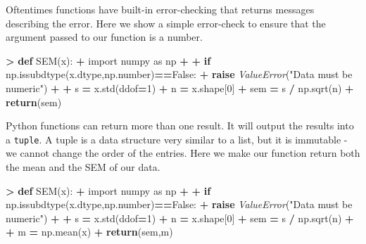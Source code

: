 \documentclass[
]{book}
\newenvironment{Shaded}{\begin{snugshade}}{\end{snugshade}}
\newcommand{\ControlFlowTok}[1]{\textcolor[rgb]{0.13,0.29,0.53}{\textbf{#1}}}
\newcommand{\DecValTok}[1]{\textcolor[rgb]{0.00,0.00,0.81}{#1}}
\newcommand{\ImportTok}[1]{#1}
\newcommand{\KeywordTok}[1]{\textcolor[rgb]{0.13,0.29,0.53}{\textbf{#1}}}
\newcommand{\NormalTok}[1]{#1}
\newcommand{\OperatorTok}[1]{\textcolor[rgb]{0.81,0.36,0.00}{\textbf{#1}}}
\newcommand{\PreprocessorTok}[1]{\textcolor[rgb]{0.56,0.35,0.01}{\textit{#1}}}
\newcommand{\StringTok}[1]{\textcolor[rgb]{0.31,0.60,0.02}{#1}}
\newcommand{\VariableTok}[1]{\textcolor[rgb]{0.00,0.00,0.00}{#1}}
\begin{document}
Oftentimes functions have built-in error-checking that returns messages describing the error. Here we show a simple error-check to ensure that the argument passed to our function is a number.

\begin{Shaded}
\begin{Highlighting}[]
\OperatorTok{\textgreater{}} \KeywordTok{def}\NormalTok{ SEM(x):}
\OperatorTok{+}   \ImportTok{import}\NormalTok{ numpy }\ImportTok{as}\NormalTok{ np}
\OperatorTok{+}   
\OperatorTok{+}   \ControlFlowTok{if}\NormalTok{ np.issubdtype(x.dtype,np.number)}\OperatorTok{==}\VariableTok{False}\NormalTok{:}
\OperatorTok{+}     \ControlFlowTok{raise} \PreprocessorTok{ValueError}\NormalTok{(}\StringTok{"Data must be numeric"}\NormalTok{)}
\OperatorTok{+}   
\OperatorTok{+}\NormalTok{   s }\OperatorTok{=}\NormalTok{ x.std(ddof}\OperatorTok{=}\DecValTok{1}\NormalTok{) }
\OperatorTok{+}\NormalTok{   n }\OperatorTok{=}\NormalTok{ x.shape[}\DecValTok{0}\NormalTok{] }
\OperatorTok{+}\NormalTok{   sem }\OperatorTok{=}\NormalTok{ s }\OperatorTok{/}\NormalTok{ np.sqrt(n) }
\OperatorTok{+}   \ControlFlowTok{return}\NormalTok{(sem) }
\end{Highlighting}
\end{Shaded}

Python functions can return more than one result. It will output the results into a \texttt{tuple}. A tuple is a data structure very similar to a list, but it is immutable - we cannot change the order of the entries. Here we make our function return both the mean and the SEM of our data.

\begin{Shaded}
\begin{Highlighting}[]
\OperatorTok{\textgreater{}} \KeywordTok{def}\NormalTok{ SEM(x):}
\OperatorTok{+}   \ImportTok{import}\NormalTok{ numpy }\ImportTok{as}\NormalTok{ np}
\OperatorTok{+}   
\OperatorTok{+}   \ControlFlowTok{if}\NormalTok{ np.issubdtype(x.dtype,np.number)}\OperatorTok{==}\VariableTok{False}\NormalTok{:}
\OperatorTok{+}     \ControlFlowTok{raise} \PreprocessorTok{ValueError}\NormalTok{(}\StringTok{"Data must be numeric"}\NormalTok{)}
\OperatorTok{+}   
\OperatorTok{+}\NormalTok{   s }\OperatorTok{=}\NormalTok{ x.std(ddof}\OperatorTok{=}\DecValTok{1}\NormalTok{) }
\OperatorTok{+}\NormalTok{   n }\OperatorTok{=}\NormalTok{ x.shape[}\DecValTok{0}\NormalTok{] }
\OperatorTok{+}\NormalTok{   sem }\OperatorTok{=}\NormalTok{ s }\OperatorTok{/}\NormalTok{ np.sqrt(n) }
\OperatorTok{+}   
\OperatorTok{+}\NormalTok{   m }\OperatorTok{=}\NormalTok{ np.mean(x)}
\OperatorTok{+}   \ControlFlowTok{return}\NormalTok{(sem,m) }
\end{Highlighting}
\end{Shaded}
\end{document}
